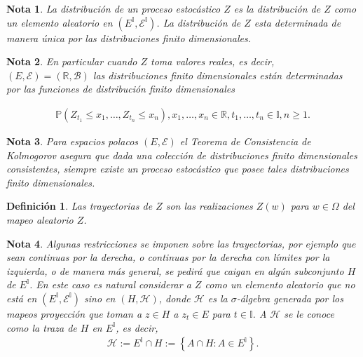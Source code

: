 \documentclass{article}
\newtheorem{Def}{Definición}[section]
\newtheorem{Note}{Nota}%
\newcommand{\prob}{\mathbb{P}}
\numberwithin{equation}{section}
\begin{document}
\begin{Note}
La distribuci\'on de un proceso estoc\'astico $Z$ es la distribuci\'on de $Z$ como un elemento aleatorio en $\left(E^{\mathbb{I}},\mathcal{E}^{\mathbb{I}}\right)$. La distribuci\'on de $Z$ esta determinada de manera \'unica por las distribuciones finito dimensionales.
\end{Note}

\begin{Note}
En particular cuando $Z$ toma valores reales, es decir, $\left(E,\mathcal{E}\right)=\left(\mathbb{R},\mathcal{B}\right)$ las distribuciones finito dimensionales est\'an determinadas por las funciones de distribuci\'on finito dimensionales

\begin{eqnarray}
\prob\left(Z_{t_{1}}\leq x_{1},\ldots,Z_{t_{n}}\leq x_{n}\right),x_{1},\ldots,x_{n}\in\mathbb{R},t_{1},\ldots,t_{n}\in\mathbb{I},n\geq1.
\end{eqnarray}
\end{Note}

\begin{Note}
Para espacios polacos $\left(E,\mathcal{E}\right)$ el Teorema de Consistencia de Kolmogorov asegura que dada una colecci\'on de distribuciones finito dimensionales consistentes, siempre existe un proceso estoc\'astico que posee tales distribuciones finito dimensionales.
\end{Note}


\begin{Def}
Las trayectorias de $Z$ son las realizaciones $Z\left(w\right)$ para $w\in\Omega$ del mapeo aleatorio $Z$.
\end{Def}

\begin{Note}
Algunas restricciones se imponen sobre las trayectorias, por ejemplo que sean continuas por la derecha, o continuas por la derecha con l\'imites por la izquierda, o de manera m\'as general, se pedir\'a que caigan en alg\'un subconjunto $H$ de $E^{\mathbb{I}}$. En este caso es natural considerar a $Z$ como un elemento aleatorio que no est\'a en $\left(E^{\mathbb{I}},\mathcal{E}^{\mathbb{I}}\right)$ sino en $\left(H,\mathcal{H}\right)$, donde $\mathcal{H}$ es la $\sigma$-\'algebra generada por los mapeos proyecci\'on que toman a $z\in H$ a $z_{t}\in E$ para $t\in\mathbb{I}$. A $\mathcal{H}$ se le conoce como la traza de $H$ en $E^{\mathbb{I}}$, es decir,
\begin{eqnarray}
\mathcal{H}:=E^{\mathbb{I}}\cap H:=\left\{A\cap H:A\in E^{\mathbb{I}}\right\}.
\end{eqnarray}
\end{Note}
\end{document}
